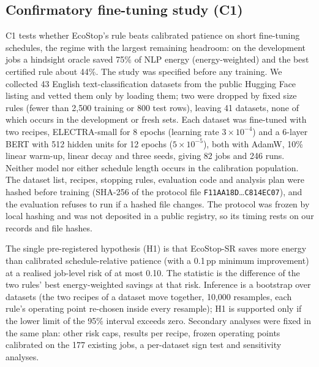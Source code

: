 \documentclass[3p,twocolumn,10pt]{elsarticle}
\theoremstyle{definition}
\begin{document}
\subsection{Confirmatory fine-tuning study (C1)}
\label{sec:c1setup}
C1 tests whether EcoStop's rule beats calibrated patience on short fine-tuning schedules, the regime with the largest remaining headroom: on the development jobs a hindsight oracle saved 75\% of NLP energy (energy-weighted) and the best certified rule about 44\%. The study was specified before any training. We collected 43 English text-classification datasets from the public Hugging Face listing and vetted them only by loading them; two were dropped by fixed size rules (fewer than 2{,}500 training or 800 test rows), leaving 41 datasets, none of which occurs in the development or fresh sets. Each dataset was fine-tuned with two recipes, ELECTRA-small for 8 epochs (learning rate $3\times10^{-4}$) and a 6-layer BERT with 512 hidden units \citep{turc2019wellread} for 12 epochs ($5\times10^{-5}$), both with AdamW, 10\% linear warm-up, linear decay and three seeds, giving 82 jobs and 246 runs. Neither model nor either schedule length occurs in the calibration population. The dataset list, recipes, stopping rules, evaluation code and analysis plan were hashed before training (SHA-256 of the protocol file \texttt{F11AA18D}\dots\texttt{C814EC07}), and the evaluation refuses to run if a hashed file changes. The protocol was frozen by local hashing and was not deposited in a public registry, so its timing rests on our records and file hashes.

The single pre-registered hypothesis (H1) is that EcoStop-SR saves more energy than calibrated schedule-relative patience (with a 0.1\,pp minimum improvement) at a realised job-level risk of at most 0.10. The statistic is the difference of the two rules' best energy-weighted savings at that risk. Inference is a bootstrap over datasets (the two recipes of a dataset move together, 10{,}000 resamples, each rule's operating point re-chosen inside every resample); H1 is supported only if the lower limit of the 95\% interval exceeds zero. Secondary analyses were fixed in the same plan: other risk caps, results per recipe, frozen operating points calibrated on the 177 existing jobs, a per-dataset sign test and sensitivity analyses.
\end{document}

